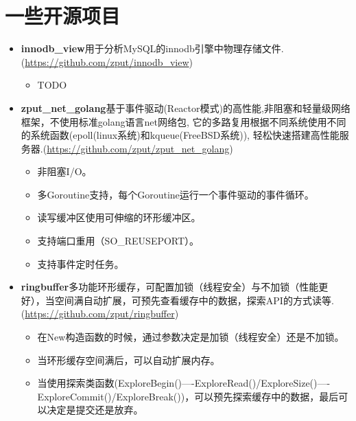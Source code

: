 \documentclass{resume}
\begin{document}
\section{一些开源项目}
\begin{itemize}[parsep=0.2ex]
  \item \textbf{innodb\_view}用于分析MySQL的innodb引擎中物理存储文件.(\url{https://github.com/zput/innodb\_view})
    \begin{itemize}[parsep=0.2ex]
        \item TODO
    \end{itemize}

  \item \textbf{zput\_net\_golang}基于事件驱动(Reactor模式)的高性能,非阻塞和轻量级网络框架，不使用标准golang语言net网络包, 它的多路复用根据不同系统使用不同的系统函数(epoll(linux系统)和kqueue(FreeBSD系统)), 轻松快速搭建高性能服务器.(\url{https://github.com/zput/zput\_net\_golang})
    \begin{itemize}[parsep=0.2ex]
          \item 非阻塞I/O。
          \item 多Goroutine支持，每个Goroutine运行一个事件驱动的事件循环。
          \item 读写缓冲区使用可伸缩的环形缓冲区。
          \item 支持端口重用（SO\_REUSEPORT）。
          \item 支持事件定时任务。
    \end{itemize}

  \item \textbf{ringbuffer}多功能环形缓存，可配置加锁（线程安全）与不加锁（性能更好），当空间满自动扩展，可预先查看缓存中的数据，探索API的方式读等.(\url{https://github.com/zput/ringbuffer})
    \begin{itemize}[parsep=0.2ex]
          \item 在New构造函数的时候，通过参数决定是加锁（线程安全）还是不加锁。
          \item 当环形缓存空间满后，可以自动扩展内存。
          \item 当使用探索类函数(ExploreBegin()----ExploreRead()/ExploreSize()----ExploreCommit()/ExploreBreak())，可以预先探索缓存中的数据，最后可以决定是提交还是放弃。
    \end{itemize}


\end{itemize}
\end{document}

